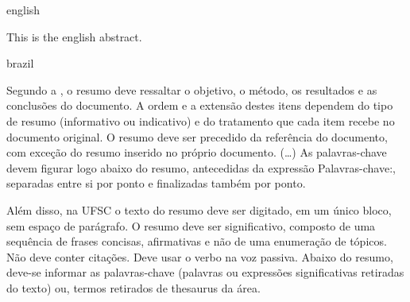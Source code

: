 \swapcontents
{
    \begin{otherlanguage*}{english}
    \begin{resumo}[Abstract]

        This is the english abstract.


    \end{resumo}
    \end{otherlanguage*}
}
{
    \begin{otherlanguage*}{brazil}
    \begin{resumo}[Resumo]

        Segundo a , o resumo deve ressaltar o
        objetivo, o método, os resultados e as conclusões do documento. A ordem e a extensão
        destes itens dependem do tipo de resumo (informativo ou indicativo) e do
        tratamento que cada item recebe no documento original. O resumo deve ser
        precedido da referência do documento, com exceção do resumo inserido no
        próprio documento. (\ldots) As palavras-chave devem figurar logo abaixo do
        resumo, antecedidas da expressão Palavras-chave:, separadas entre si por
        ponto e finalizadas também por ponto.

        Além disso, na UFSC o texto do resumo deve ser digitado, em um único bloco, sem espaço de parágrafo. O resumo deve
        ser significativo, composto de uma sequência de frases concisas, afirmativas e não de uma
        enumeração de tópicos. Não deve conter citações. Deve usar o verbo na voz passiva. Abaixo do
        resumo, deve-se informar as palavras-chave (palavras ou expressões significativas retiradas do
        texto) ou, termos retirados de thesaurus da área. 


    \end{resumo}
    \end{otherlanguage*}
}



